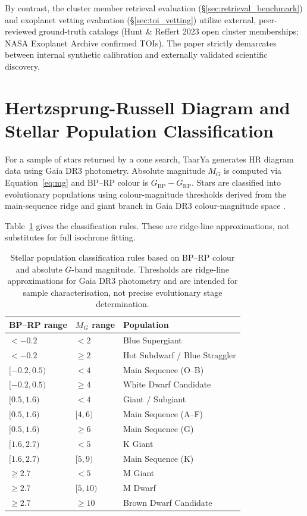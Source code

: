 \documentclass[12pt]{elsarticle}
\begin{document}
By contrast, the cluster member retrieval evaluation (\S\ref{sec:retrieval_benchmark}) and exoplanet vetting evaluation (\S\ref{sec:toi_vetting}) utilize external, peer-reviewed ground-truth catalogs (Hunt \& Reffert 2023 open cluster memberships; NASA Exoplanet Archive confirmed TOIs). The paper strictly demarcates between internal synthetic calibration and externally validated scientific discovery.

\section{Hertzsprung-Russell Diagram and Stellar Population Classification}
\label{sec:hr}

For a sample of stars returned by a cone search, \textsf{TaarYa} generates HR diagram data using Gaia DR3 photometry. Absolute magnitude $M_G$ is computed via Equation~\eqref{eq:mg} and BP--RP colour is $G_{\mathrm{BP}} - G_{\mathrm{RP}}$. Stars are classified into evolutionary populations using colour-magnitude thresholds derived from the main-sequence ridge and giant branch in Gaia DR3 colour-magnitude space \citep{Vallenari2023, Lindegren2021}.

Table~\ref{tab:population} gives the classification rules. These are ridge-line approximations, not substitutes for full isochrone fitting.

\begin{table}[htbp]
\centering
\caption{Stellar population classification rules based on BP--RP colour and absolute $G$-band magnitude. Thresholds are ridge-line approximations for Gaia DR3 photometry and are intended for sample characterisation, not precise evolutionary stage determination.}
\label{tab:population}
\begin{tabular}{p{3.5cm}p{3.5cm}p{6.0cm}}
\toprule
\textbf{BP--RP range} & \textbf{$M_G$ range} & \textbf{Population} \\
\midrule
$< -0.2$ & $< 2$ & Blue Supergiant \\
$< -0.2$ & $\ge 2$ & Hot Subdwarf / Blue Straggler \\
$[ -0.2, 0.5)$ & $< 4$ & Main Sequence (O--B) \\
$[ -0.2, 0.5)$ & $\ge 4$ & White Dwarf Candidate \\
$[0.5, 1.6)$ & $< 4$ & Giant / Subgiant \\
$[0.5, 1.6)$ & $[4, 6)$ & Main Sequence (A--F) \\
$[0.5, 1.6)$ & $\ge 6$ & Main Sequence (G) \\
$[1.6, 2.7)$ & $< 5$ & K Giant \\
$[1.6, 2.7)$ & $[5, 9)$ & Main Sequence (K) \\
$\ge 2.7$ & $< 5$ & M Giant \\
$\ge 2.7$ & $[5, 10)$ & M Dwarf \\
$\ge 2.7$ & $\ge 10$ & Brown Dwarf Candidate \\
\bottomrule
\end{tabular}
\end{table}
\end{document}
